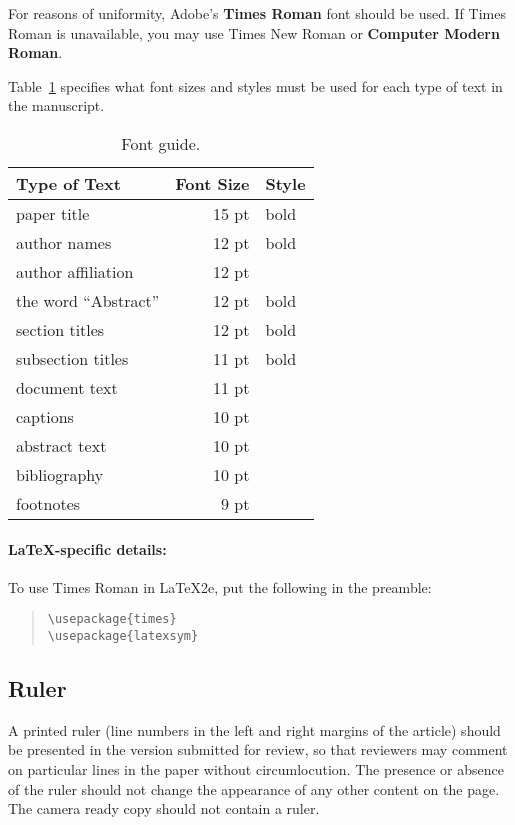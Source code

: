 \documentclass[11pt,a4paper]{article}
\begin{document}
For reasons of uniformity, Adobe's \textbf{Times Roman} font should be used.
If Times Roman is unavailable, you may use Times New Roman or \textbf{Computer Modern Roman}.

Table~\ref{font-table} specifies what font sizes and styles must be used for each type of text in the manuscript.

\begin{table}
\centering
\begin{tabular}{lrl}
\hline \textbf{Type of Text} & \textbf{Font Size} & \textbf{Style} \\ \hline
paper title & 15 pt & bold \\
author names & 12 pt & bold \\
author affiliation & 12 pt & \\
the word ``Abstract'' & 12 pt & bold \\
section titles & 12 pt & bold \\
subsection titles & 11 pt & bold \\
document text & 11 pt  &\\
captions & 10 pt & \\
abstract text & 10 pt & \\
bibliography & 10 pt & \\
footnotes & 9 pt & \\
\hline
\end{tabular}
\caption{\label{font-table} Font guide. }
\end{table}

\paragraph{\LaTeX-specific details:}
To use Times Roman in \LaTeX2e{}, put the following in the preamble:
\begin{quote}
\small
\begin{verbatim}
\usepackage{times}
\usepackage{latexsym}
\end{verbatim}
\end{quote}


\subsection{Ruler}
A printed ruler (line numbers in the left and right margins of the article) should be presented in the version submitted for review, so that reviewers may comment on particular lines in the paper without circumlocution.
The presence or absence of the ruler should not change the appearance of any other content on the page.
The camera ready copy should not contain a ruler.
\end{document}
